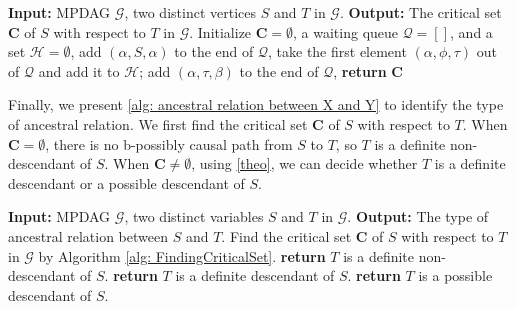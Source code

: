 \documentclass{article}
\begin{document}
\begin{algorithm}
\caption{Finding the critical set of $S$ with respect to $T$ in an MPDAG}
\label{alg: FindingCriticalSet}
\begin{algorithmic}[1]
\State \textbf{Input:} MPDAG $\mathcal{G}$, two distinct vertices $S$ and $T$ in $\mathcal{G}$.
\State \textbf{Output:} The critical set $\mathbf{C}$ of $S$ with respect to $T$ in $\mathcal{G}$.
\State Initialize $\mathbf{C}=\emptyset$, a waiting queue $\mathcal{Q}=[]$, and a set $\mathcal{H}=\emptyset$,
    \State add $(\alpha, S, \alpha)$ to the end of $\mathcal{Q}$,
\EndFor
{}
    \State take the first element $(\alpha, \phi, \tau)$ out of $\mathcal{Q}$ and add it to $\mathcal{H}$;
    \Else
                        \State add $(\alpha, \tau, \beta)$ to the end of $\mathcal{Q}$,
                        \EndIf
                    \EndIf
                \EndIf
            \EndIf
        \EndFor
    \EndIf
\EndWhile
\State \textbf{return} $\mathbf{C}$
\end{algorithmic}
\end{algorithm}

Finally, we present \cref{alg: ancestral relation between X and Y} to identify the type of ancestral relation. We first find the critical set $\mathbf{C}$ of $S$ with respect to $T$. When $\mathbf{C} = \emptyset$, there is no b-possibly causal path from $S$ to $T$, so $T$ is a definite non-descendant of $S$. When $\mathbf{C} \neq \emptyset$, using \cref{theo}, we can decide whether $T$ is a definite descendant or a possible descendant of $S$. 

\begin{algorithm}
\begin{algorithmic}[1]
\caption{Identify the type of ancestral relation of $S$ with respect to $T$ in an MPDAG}
\label{alg: ancestral relation between X and Y}
\State \textbf{Input:} MPDAG $\mathcal{G}$, two distinct variables $S$ and $T$ in $\mathcal{G}$.
\State \textbf{Output:} The type of ancestral relation between $S$ and $T$.
\State Find the critical set $\mathbf{C}$ of $S$ with respect to $T$ in $\mathcal{G}$ by Algorithm \ref{alg: FindingCriticalSet}.
    \State \textbf{return} $T$ is a definite non-descendant of $S$.
\EndIf
{}
    \State \textbf{return} $T$ is a definite descendant of $S$.
\EndIf
\State \textbf{return} $T$ is a possible descendant of $S$.
\end{algorithmic}
\end{algorithm}
\end{document}

